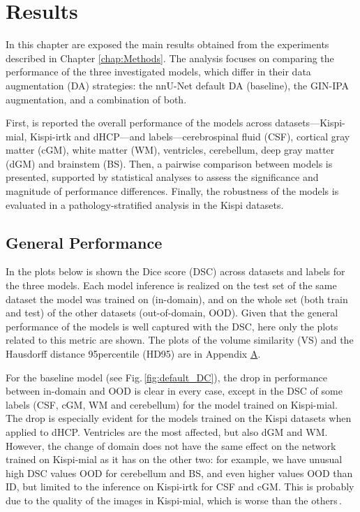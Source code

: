 \chapter{Results} \label{chap:Results}
\vspace{1cm}

In this chapter are exposed the main results obtained from the experiments described in Chapter \ref{chap:Methods}. The analysis focuses on comparing the performance of the three investigated models, which differ in their data augmentation (DA) strategies: the nnU-Net default DA (baseline), the GIN-IPA augmentation, and a combination of both.

First, is reported the overall performance of the models across datasets---Kispi-mial, Kispi-irtk and dHCP---and labels---cerebrospinal fluid (CSF), cortical gray matter (cGM), white matter (WM), ventricles, cerebellum, deep gray matter (dGM) and brainstem (BS). Then, a pairwise comparison between models is presented, supported by statistical analyses to assess the significance and magnitude of performance differences. Finally, the robustness of the models is evaluated in a pathology-stratified analysis in the Kispi datasets.

\section{General Performance} \label{sec:GeneralPerformance}
In the plots below is shown the Dice score (DSC) across datasets and labels for the three models. Each model inference is realized on the test set of the same dataset the model was trained on (in-domain), and on the whole set (both train and test) of the other datasets (out-of-domain, OOD). Given that the general performance of the models is well captured with the DSC, here only the plots related to this metric are shown. The plots of the volume similarity (VS) and the Hausdorff distance 95\th percentile (HD95) are in Appendix \hyperref[app:SupplementaryPlots]{A}.

For the baseline model (see Fig.\,\ref{fig:default_DC}), the drop in performance between in-domain and OOD is clear in every case, except in the DSC of some labels (CSF, cGM, WM and cerebellum) for the model trained on Kispi-mial. The drop is especially evident for the models trained on the Kispi datasets when applied to dHCP. Ventricles are the most affected, but also dGM and WM. However, the change of domain does not have the same effect on the network trained on Kispi-mial as it has on the other two: for example, we have unusual high DSC values OOD for cerebellum and BS, and even higher values OOD than ID, but limited to the inference on Kispi-irtk for CSF and cGM. This is probably due to the quality of the images in Kispi-mial, which is worse than the others\,\cite{FeTA2021_review}.

